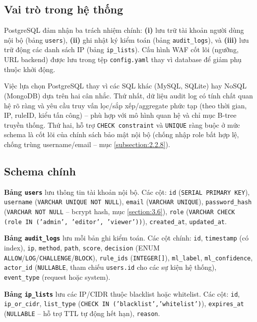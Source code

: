 \documentclass[../DoAn.tex]{subfiles}
\begin{document}
\subsection{Vai trò trong hệ thống}
\label{subsection:3.5.2}

PostgreSQL đảm nhận ba trách nhiệm chính: \textbf{(i)} lưu trữ tài khoản
người dùng nội bộ (bảng \texttt{users}), \textbf{(ii)} ghi nhật ký kiểm
toán (bảng \texttt{audit\_logs}), và \textbf{(iii)} lưu trữ động các danh
sách IP (bảng \texttt{ip\_lists}). Cấu hình WAF cốt lõi (ngưỡng, URL backend)
được lưu trong tệp \texttt{config.yaml} thay vì database để giảm phụ thuộc
khởi động.

Việc lựa chọn PostgreSQL thay vì các SQL khác (MySQL, SQLite) hay NoSQL
(MongoDB) dựa trên hai cân nhắc. Thứ nhất, dữ liệu audit log có tính chất
quan hệ rõ ràng và yêu cầu truy vấn lọc/sắp xếp/aggregate phức tạp (theo
thời gian, IP, ruleID, kiểu tấn công) -- phù hợp với mô hình quan hệ và
chỉ mục B-tree truyền thống. Thứ hai, hỗ trợ \texttt{CHECK constraint} và
\texttt{UNIQUE} ràng buộc ở mức schema là cốt lõi của chính sách bảo mật
nội bộ (chống nhập role bất hợp lệ, chống trùng username/email -- mục
\ref{subsection:2.2.8}).

\subsection{Schema chính}
\label{subsection:3.5.3}

\textbf{Bảng \texttt{users}} lưu thông tin tài khoản nội bộ. Các cột:
\texttt{id} (\texttt{SERIAL PRIMARY KEY}), \texttt{username}
(\texttt{VARCHAR UNIQUE NOT NULL}), \texttt{email} (\texttt{VARCHAR UNIQUE}),
\texttt{password\_hash} (\texttt{VARCHAR NOT NULL} -- bcrypt hash, mục
\ref{section:3.6}), \texttt{role} (\texttt{VARCHAR CHECK (role IN ('admin',
'editor', 'viewer'))}), \texttt{created\_at}, \texttt{updated\_at}.

\textbf{Bảng \texttt{audit\_logs}} lưu mỗi bản ghi kiểm toán. Các cột chính:
\texttt{id}, \texttt{timestamp} (có index), \texttt{ip}, \texttt{method},
\texttt{path}, \texttt{score}, \texttt{decision} (ENUM \texttt{ALLOW}/\texttt{LOG}/\texttt{CHALLENGE}/\texttt{BLOCK}),
\texttt{rule\_ids} (\texttt{INTEGER[]}), \texttt{ml\_label}, \texttt{ml\_confidence},
\texttt{actor\_id} (\texttt{NULLABLE}, tham chiếu \texttt{users.id} cho các
sự kiện hệ thống), \texttt{event\_type} (request hoặc system).

\textbf{Bảng \texttt{ip\_lists}} lưu các IP/CIDR thuộc blacklist hoặc
whitelist. Các cột: \texttt{id}, \texttt{ip\_or\_cidr}, \texttt{list\_type}
(\texttt{CHECK IN ('blacklist','whitelist')}), \texttt{expires\_at}
(\texttt{NULLABLE} -- hỗ trợ TTL tự động hết hạn), \texttt{reason}.
\end{document}
